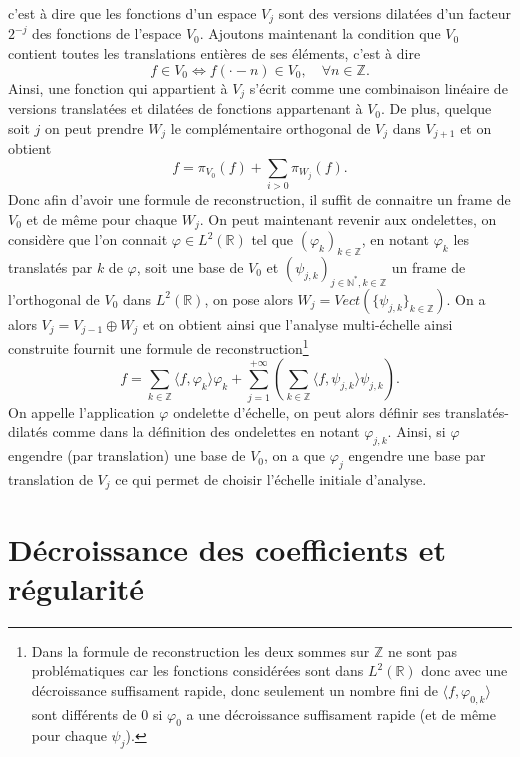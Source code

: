 c'est à dire que les fonctions d'un espace $V_j$ sont des versions dilatées d'un facteur $2^{-j}$ des fonctions de l'espace $V_0$.
Ajoutons maintenant la condition que $V_0$ contient toutes les translations entières de ses éléments, c'est à dire
\begin{equation}
	f \in V_0 \iff f(\cdot - n) \in V_0,\quad \forall n \in \mathbb{Z}.
\end{equation}
Ainsi, une fonction qui appartient à $V_j$ s'écrit comme une combinaison linéaire de versions translatées et dilatées de fonctions appartenant à $V_0$.
De plus, quelque soit $j$ on peut prendre $W_j$ le complémentaire orthogonal de $V_j$ dans $V_{j+1}$ et on obtient 
\begin{equation}
	f = \pi_{V_0}(f) +\sum_{i>0} \pi_{W_j}(f). 
\end{equation}
Donc afin d'avoir une formule de reconstruction, il suffit de connaitre un frame de $V_0$ et de même pour chaque $W_j$. 
On peut maintenant revenir aux ondelettes, on considère que l'on connait $\varphi \in L^2(\mathbb{R})$ tel que $(\varphi_{k})_{k\in \mathbb{Z}}$, en notant $\varphi_k$ les translatés par $k$ de $\varphi$, soit une base de $V_0$ et $(\psi_{j,k})_{j\in \mathbb{N}^*, k \in \mathbb{Z}}$ un frame de l'orthogonal de $V_0$ dans $L^2(\mathbb{R})$, on pose alors $W_j = Vect(\{\psi_{j,k}\}_{k\in \mathbb{Z}})$.
On a alors $V_j = V_{j-1}\oplus W_j$ et on obtient ainsi que l'analyse multi-échelle ainsi construite fournit une formule de reconstruction\footnote{Dans la formule de reconstruction les deux sommes sur $\mathbb{Z}$ ne sont pas problématiques car les fonctions considérées sont dans $L^2(\mathbb{R})$ donc avec une décroissance suffisament rapide, donc seulement un nombre fini de $\langle f, \varphi_{0,k} \rangle$ sont différents de 0 si $\varphi_0$ a une décroissance suffisament rapide (et de même pour chaque $\psi_j$).}
\begin{equation}
	f = \sum_{k\in\mathbb{Z}} \langle f, \varphi_{k} \rangle \varphi_{k} + \sum_{j = 1}^{+\infty}\left( \sum_{k\in \mathbb{Z}} \langle f, \psi_{j,k} \rangle \psi_{j,k}\right).
\end{equation}
On appelle l'application $\varphi$ ondelette d'échelle, on peut alors définir ses translatés-dilatés comme dans la définition des ondelettes en notant $\varphi_{j,k}$.
Ainsi, si $\varphi$ engendre (par translation) une base de $V_0$, on a que $\varphi_{j}$ engendre une base par translation de $V_j$ ce qui permet de choisir l'échelle initiale d'analyse.

\section{Décroissance des coefficients et régularité}
